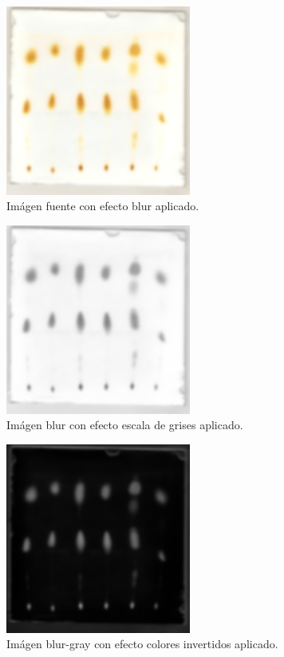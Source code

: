 \begin{figure}[H]
	\vspace{-0.2cm}
	\centering
	\includegraphics[width=230px]{imagenes-jtlc/experimento/search-cut-points/1-blur}
	\centering
	\caption{Im\'agen fuente con efecto blur aplicado.}
	\label{fig:font-blur}
	\vspace{-0.15cm}
\end{figure}
\begin{figure}[H]
	\vspace{-0.2cm}
	\centering
	\includegraphics[width=230px]{imagenes-jtlc/experimento/search-cut-points/2-gray}
	\centering
	\caption{Im\'agen blur con efecto escala de grises aplicado.}
	\label{fig:font-gray}
	\vspace{-0.15cm}
\end{figure}
\begin{figure}[H]
	\vspace{-0.2cm}
	\centering
	\includegraphics[width=230px]{imagenes-jtlc/experimento/search-cut-points/3-invert}
	\centering
	\caption{Im\'agen blur-gray con efecto colores invertidos aplicado.}
	\label{fig:font-invert}
	\vspace{-0.15cm}
\end{figure}
